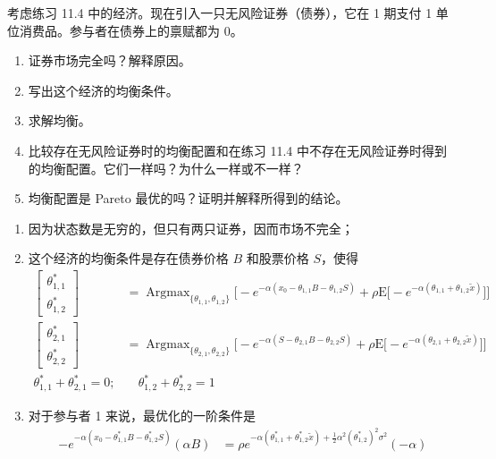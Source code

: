 \begin{problem}
 考虑练习 11.4 中的经济。现在引入一只无风险证券（债券），它在 1 期支付 1 单位消费品。参与者在债券上的禀赋都为 0。
\begin{enumerate}[label=(\alph*)]
    \item 证券市场完全吗？解释原因。
    \item 写出这个经济的均衡条件。
    \item 求解均衡。
    \item 比较存在无风险证券时的均衡配置和在练习 11.4 中不存在无风险证券时得到的均衡配置。它们一样吗？为什么一样或不一样？
    \item 均衡配置是 Pareto 最优的吗？证明并解释所得到的结论。
\end{enumerate}
\end{problem}
\begin{solution}
\begin{enumerate}[label=(\alph*)]
    \item 因为状态数是无穷的，但只有两只证券，因而市场不完全；
    \item 这个经济的均衡条件是存在债券价格 $B$ 和股票价格 $S$，使得
    \[
        \begin{aligned}
            \begin{bmatrix}\theta_{1,1}^{*} \\ \theta_{1,2}^{*}\end{bmatrix}&=\operatorname{Argmax}_{\{\theta_{1,1},\theta_{1,2}\}}\bigl[-e^{-\alpha(x_{0}-\theta_{1,1}B-\theta_{1,2}S)}+\rho\mathrm{E}\bigl[-e^{-\alpha(\theta_{1,1}+\theta_{1,2}\tilde{x})}\bigr]\bigr]\\
            \begin{bmatrix}\theta_{2,1}^{*} \\ \theta_{2,2}^{*}\end{bmatrix}&=\operatorname{Argmax}_{\{\theta_{2,1},\theta_{2,2}\}}\bigl[-e^{-\alpha(S-\theta_{2,1}B-\theta_{2,2}S)}+\rho\mathrm{E}\bigl[-e^{-\alpha(\theta_{2,1}+\theta_{2,2}\tilde{x})}\bigr]\bigr]\\
            \theta_{1,1}^{*}+\theta_{2,1}^{*}=0;&\quad\theta_{1,2}^{*}+\theta_{2,2}^{*}=1
        \end{aligned}
    \]
    \item 对于参与者 1 来说，最优化的一阶条件是
    \begin{align}
            -e^{-\alpha(x_{0}-\theta_{1,1}^{*}B-\theta_{1,2}^{*}S)}(\alpha B)
            &=\rho e^{-\alpha(\theta_{1,1}^{*}+\theta_{1,2}^{*}\tilde{x})+\frac12\alpha^{2}(\theta_{1,2}^{*})^{2}\sigma^{2}}(-\alpha)

\end{align}
\end{enumerate}
\end{solution}
